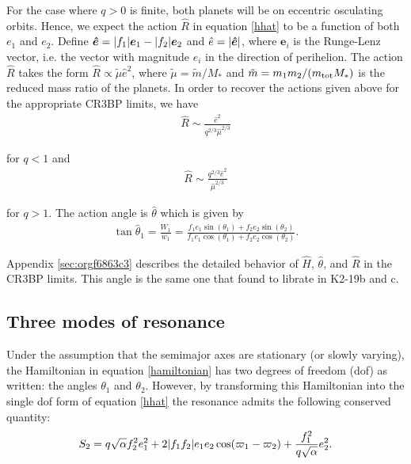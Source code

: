 \documentclass[usenatbib,onecolumn]{mnras}
\renewcommand{\v}[1]{\boldsymbol{ #1 }}
\DeclarePairedDelimiter{\abs}{|}{|}
\begin{document}
For the case where \(q>0\) is finite, both planets will be on eccentric
osculating orbits.  Hence, we expect the action \(\hat R\) in equation
\eqref{hhat} to be a function of both \(e_1\) and \(e_2\).  Define \(\v{\hat
e} = \abs{f_1}\v e_1 - \abs{f_2}\v e_2\) and \(\hat e = \abs{\v{\hat
e}}\), where \(\v e_i\) is the Runge-Lenz vector, i.e. the vector with
magnitude \(e_i\) in the direction of perihelion.  The action \(\hat R\)
takes the form \(\hat R \propto \tilde \mu \hat e^2\), where
\(\tilde\mu=\tilde m/M_*\) and \(\tilde m= m_1m_2/(m_{\rm tot}M_*)\) is
the reduced mass ratio of the planets. In order to recover the actions
given above for the appropriate CR3BP limits, we have
\begin{align}
\label{eq:R1hatlimit}
  \hat R \sim\frac{\hat e^2}{q^{2/3}\hat\mu^{2/3}}
\end{align}

\noindent for \(q < 1\) and
\begin{align}
\label{eq:R2hatlimit}
  \hat R \sim\frac{q^{2/3}\hat e^2}{\hat\mu^{2/3}}
\end{align}

\noindent for \(q>1\).  The action angle is \(\hat\theta\) which
is given by
\begin{align}
\label{hattheta}
  \tan\hat{\theta}_1 = \frac{W_1}{w_1} = \frac{f_1 e_1\sin(\theta_1)
  + f_2e_2\sin(\theta_2)}{f_1e_1\cos(\theta_1) + f_2e_2\cos(\theta_2)}.
\end{align}

\noindent
Appendix \ref{sec:orgf6863c3}
describes the detailed behavior of \(\hat H\), \(\hat \theta\),
and \(\hat R\) in the CR3BP limits.
This angle is the same one that \citet{petit_resonance_2020}
found to librate in K2-19b and c.

\subsection{Three modes of resonance}
\label{sec:org12bb74d}
Under the assumption that the semimajor axes are stationary (or slowly
varying), the Hamiltonian in equation \eqref{hamiltonian} has two
degrees of freedom (dof) as written: the angles \(\theta_1\) and
\(\theta_2\).  However, by transforming this Hamiltonian into the single
dof form of equation \eqref{hhat} the resonance admits the following
conserved quantity:
\begin{align}
  \label{eq:s2}
  S_2 = q\sqrt{\alpha}f_2^2e_1^2
+2\abs{f_1f_2}e_1e_2\cos(\varpi_1-\varpi_2) + \frac{f_1^2}{q\sqrt\alpha}e_2^2.
\end{align}
\end{document}
